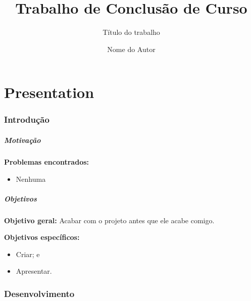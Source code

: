 \documentclass[xcolor=table]{beamer}
\title[Trabalho de Conclusão de Curso]{Trabalho de Conclusão de Curso}
\subtitle{Título do trabalho}
\author[Nome do Autor]{Nome do Autor}
\institute[UFVJM]{Universidade Federal dos Vales do Jequitinhonha e Mucuri \newline
  Bacharelado em Sistemas de Informação \newline
	  
     Orientador: Prof. Fulano\\
     Coorientador: Cicrano\\
     $~$\\
}
\begin{document}
\frame{\titlepage}

\part{Presentation}




\section{Introdução}


\begin{frame}
    \frametitle{Motivação}
    
    \textbf{Problemas encontrados:}
    \begin{itemize}
        \item Nenhuma
    \end{itemize}

\end{frame}


\begin{frame}
    \frametitle{Objetivos}
    \textbf{Objetivo geral:} Acabar com o projeto antes que ele acabe comigo.
    
    \textbf{Objetivos específicos:}
    \begin{itemize}
        \item Criar; e
        \item Apresentar.
    \end{itemize}
\end{frame}


\section{Desenvolvimento}
\end{document}
